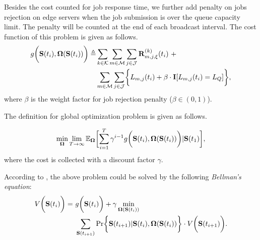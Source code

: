 Besides the cost counted for job response time, we further add penalty on jobs rejection on edge servers when the job submission is over the queue capacity limit. The penalty will be counted at the end of each broadcast interval.
The cost function of this problem is given as follows.
\begin{align}
    g\Paren{\Stat(t_{i}), \Policy(\Stat(t_{i}))} \define
        &\sum_{k\in\apSet} \sum_{m\in\esSet} \sum_{j\in\jSpace} \vec{R}^{(k)}_{m,j,\xi}(t_{i})~+
        \nonumber\\
        &\sum_{m\in\esSet} \sum_{j\in\jSpace} \Brace{L_{m,j}(t_{i}) + \beta \cdot \mat{I}[L_{m,j}(t_{i})=L_Q]},
\end{align}
where $\beta$ is the weight factor for job rejection penalty ($\beta \in (0,1)$).
        
The definition for global optimization problem is given as follows.
\begin{problem}
    \begin{align}
        \min_{\Policy} \lim_{T \to \infty}
            \mathbb{E}_{\Policy}
                \Bracket{\sum_{i=1}^{T} \gamma^{i-1} g\Paren{\Stat(t_{i}), \Policy(\Stat(t_{i}))}|\Stat(t_1)},
    \end{align}
    where the cost is collected with a discount factor $\gamma$.
\end{problem}
According to \cite{sutton1998introduction}, the above problem could be solved by the following \emph{Bellman's equation}:
\begin{align}
    V\Paren{\Stat(t_{i})} =~&g\Paren{\Stat(t_{i})} + \gamma \min_{\Policy(\Stat(t_{i}))}
        \nonumber\\
        &\sum_{\Stat(t_{i+1})} \Pr\Brace{ \Stat(t_{i+1})|\Stat(t_{i}), \Policy(\Stat(t_{i})) } \cdot V\Paren{\Stat(t_{i+1})}.
    \label{sp_0}
\end{align}

